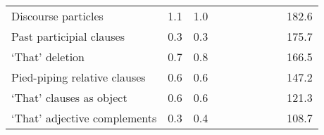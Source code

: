 \begin{table}[!t]
\begin{tabular*}{\linewidth}{@{\extracolsep{\fill}}lrrrrrrrrr}
Discourse particles & 1.1 & 1.0 & {\cellcolor[HTML]{F4A582}{\textcolor[HTML]{000000}{60\%}}} & {\cellcolor[HTML]{F4A582}{\textcolor[HTML]{000000}{60\%}}} & {\cellcolor[HTML]{FDDBC7}{\textcolor[HTML]{000000}{89\%}}} & {\cellcolor[HTML]{F7F7F7}{\textcolor[HTML]{000000}{91\%}}} & {\cellcolor[HTML]{92C5DE}{\textcolor[HTML]{000000}{146\%}}} & {\cellcolor[HTML]{92C5DE}{\textcolor[HTML]{000000}{140\%}}} & 182.6 \\ 
Past participial clauses & 0.3 & 0.3 & {\cellcolor[HTML]{4393C3}{\textcolor[HTML]{FFFFFF}{273\%}}} & {\cellcolor[HTML]{4393C3}{\textcolor[HTML]{FFFFFF}{307\%}}} & {\cellcolor[HTML]{92C5DE}{\textcolor[HTML]{000000}{158\%}}} & {\cellcolor[HTML]{92C5DE}{\textcolor[HTML]{000000}{150\%}}} & {\cellcolor[HTML]{F4A582}{\textcolor[HTML]{000000}{59\%}}} & {\cellcolor[HTML]{F4A582}{\textcolor[HTML]{000000}{71\%}}} & 175.7 \\ 
‘That’ deletion & 0.7 & 0.8 & {\cellcolor[HTML]{FDDBC7}{\textcolor[HTML]{000000}{75\%}}} & {\cellcolor[HTML]{F4A582}{\textcolor[HTML]{000000}{66\%}}} & {\cellcolor[HTML]{F4A582}{\textcolor[HTML]{000000}{75\%}}} & {\cellcolor[HTML]{F4A582}{\textcolor[HTML]{000000}{73\%}}} & {\cellcolor[HTML]{92C5DE}{\textcolor[HTML]{000000}{134\%}}} & {\cellcolor[HTML]{92C5DE}{\textcolor[HTML]{000000}{151\%}}} & 166.5 \\ 
Pied-piping relative clauses & 0.6 & 0.6 & {\cellcolor[HTML]{F4A582}{\textcolor[HTML]{000000}{59\%}}} & {\cellcolor[HTML]{F4A582}{\textcolor[HTML]{000000}{56\%}}} & {\cellcolor[HTML]{D6604D}{\textcolor[HTML]{FFFFFF}{38\%}}} & {\cellcolor[HTML]{D6604D}{\textcolor[HTML]{FFFFFF}{43\%}}} & {\cellcolor[HTML]{D6604D}{\textcolor[HTML]{FFFFFF}{50\%}}} & {\cellcolor[HTML]{F4A582}{\textcolor[HTML]{000000}{54\%}}} & 147.2 \\ 
‘That’ clauses as object & 0.6 & 0.6 & {\cellcolor[HTML]{F4A582}{\textcolor[HTML]{000000}{65\%}}} & {\cellcolor[HTML]{F4A582}{\textcolor[HTML]{000000}{56\%}}} & {\cellcolor[HTML]{F4A582}{\textcolor[HTML]{000000}{66\%}}} & {\cellcolor[HTML]{F4A582}{\textcolor[HTML]{000000}{60\%}}} & {\cellcolor[HTML]{F7F7F7}{\textcolor[HTML]{000000}{93\%}}} & {\cellcolor[HTML]{FDDBC7}{\textcolor[HTML]{000000}{90\%}}} & 121.3 \\ 
‘That’ adjective complements & 0.3 & 0.4 & {\cellcolor[HTML]{FDDBC7}{\textcolor[HTML]{000000}{80\%}}} & {\cellcolor[HTML]{F4A582}{\textcolor[HTML]{000000}{51\%}}} & {\cellcolor[HTML]{D1E5F0}{\textcolor[HTML]{000000}{121\%}}} & {\cellcolor[HTML]{F7F7F7}{\textcolor[HTML]{000000}{106\%}}} & {\cellcolor[HTML]{92C5DE}{\textcolor[HTML]{000000}{148\%}}} & {\cellcolor[HTML]{92C5DE}{\textcolor[HTML]{000000}{139\%}}} & 108.7 \\ 

\end{tabular*}
\end{table}
